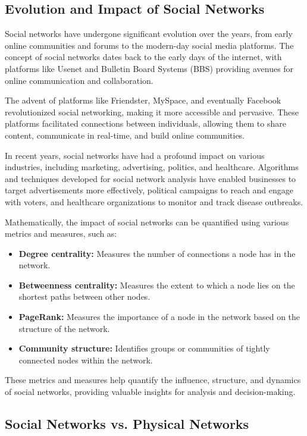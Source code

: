 \documentclass[12pt]{book} %
\begin{document}
\subsection{Evolution and Impact of Social Networks}

Social networks have undergone significant evolution over the years, from early online communities and forums to the modern-day social media platforms. The concept of social networks dates back to the early days of the internet, with platforms like Usenet and Bulletin Board Systems (BBS) providing avenues for online communication and collaboration.

The advent of platforms like Friendster, MySpace, and eventually Facebook revolutionized social networking, making it more accessible and pervasive. These platforms facilitated connections between individuals, allowing them to share content, communicate in real-time, and build online communities.

In recent years, social networks have had a profound impact on various industries, including marketing, advertising, politics, and healthcare. Algorithms and techniques developed for social network analysis have enabled businesses to target advertisements more effectively, political campaigns to reach and engage with voters, and healthcare organizations to monitor and track disease outbreaks.

Mathematically, the impact of social networks can be quantified using various metrics and measures, such as:

\begin{itemize}
    \item \textbf{Degree centrality:} Measures the number of connections a node has in the network.
    \item \textbf{Betweenness centrality:} Measures the extent to which a node lies on the shortest paths between other nodes.
    \item \textbf{PageRank:} Measures the importance of a node in the network based on the structure of the network.
    \item \textbf{Community structure:} Identifies groups or communities of tightly connected nodes within the network.
\end{itemize}

These metrics and measures help quantify the influence, structure, and dynamics of social networks, providing valuable insights for analysis and decision-making.

\subsection{Social Networks vs. Physical Networks}
\end{document}
